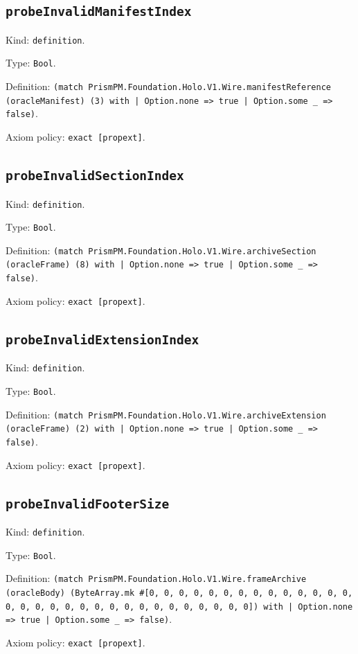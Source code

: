 \documentclass[11pt]{article}
\begin{document}
\subsection*{\texttt{probeInvalidManifestIndex}}
\noindent Kind: \texttt{definition}.\par
\noindent Type: \texttt{Bool}.\par
\noindent Definition: \texttt{(match PrismPM.Foundation.Holo.V1.Wire.manifestReference (oracleManifest) (3) with | Option.none => true | Option.some \_ => false)}.\par
\noindent Axiom policy: \texttt{exact [propext]}.\par
\subsection*{\texttt{probeInvalidSectionIndex}}
\noindent Kind: \texttt{definition}.\par
\noindent Type: \texttt{Bool}.\par
\noindent Definition: \texttt{(match PrismPM.Foundation.Holo.V1.Wire.archiveSection (oracleFrame) (8) with | Option.none => true | Option.some \_ => false)}.\par
\noindent Axiom policy: \texttt{exact [propext]}.\par
\subsection*{\texttt{probeInvalidExtensionIndex}}
\noindent Kind: \texttt{definition}.\par
\noindent Type: \texttt{Bool}.\par
\noindent Definition: \texttt{(match PrismPM.Foundation.Holo.V1.Wire.archiveExtension (oracleFrame) (2) with | Option.none => true | Option.some \_ => false)}.\par
\noindent Axiom policy: \texttt{exact [propext]}.\par
\subsection*{\texttt{probeInvalidFooterSize}}
\noindent Kind: \texttt{definition}.\par
\noindent Type: \texttt{Bool}.\par
\noindent Definition: \texttt{(match PrismPM.Foundation.Holo.V1.Wire.frameArchive (oracleBody) (ByteArray.mk \#[0, 0, 0, 0, 0, 0, 0, 0, 0, 0, 0, 0, 0, 0, 0, 0, 0, 0, 0, 0, 0, 0, 0, 0, 0, 0, 0, 0, 0, 0, 0]) with | Option.none => true | Option.some \_ => false)}.\par
\noindent Axiom policy: \texttt{exact [propext]}.\par
\end{document}

